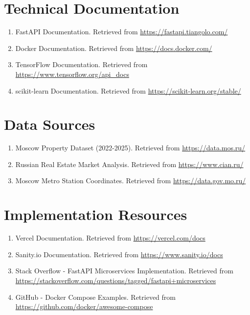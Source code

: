 \documentclass[12pt,a4paper]{report}
\begin{document}
\section{Technical Documentation}
\begin{enumerate}
    \item FastAPI Documentation. Retrieved from \url{https://fastapi.tiangolo.com/}
    
    \item Docker Documentation. Retrieved from \url{https://docs.docker.com/}
    
    \item TensorFlow Documentation. Retrieved from \url{https://www.tensorflow.org/api_docs}
    
    \item scikit-learn Documentation. Retrieved from \url{https://scikit-learn.org/stable/}
\end{enumerate}

\section{Data Sources}
\begin{enumerate}
    \item Moscow Property Dataset (2022-2025). Retrieved from \url{https://data.mos.ru/} 
    
    \item Russian Real Estate Market Analysis. Retrieved from \url{https://www.cian.ru/}
    
    \item Moscow Metro Station Coordinates. Retrieved from \url{https://data.gov.mo.ru/}
\end{enumerate}

\section{Implementation Resources}
\begin{enumerate}
    \item Vercel Documentation. Retrieved from \url{https://vercel.com/docs}
    
    \item Sanity.io Documentation. Retrieved from \url{https://www.sanity.io/docs}
    
    \item Stack Overflow - FastAPI Microservices Implementation. Retrieved from \url{https://stackoverflow.com/questions/tagged/fastapi+microservices}
    
    \item GitHub - Docker Compose Examples. Retrieved from \url{https://github.com/docker/awesome-compose}
\end{enumerate}
\end{document}
